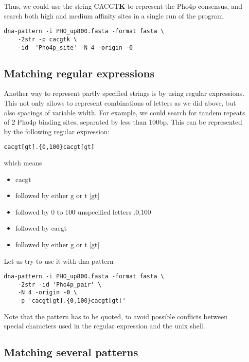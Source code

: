 Thus, we could use the string CACGT\textbf{K} to represent the Pho4p
consensus, and search both high and medium affinity sites in a single
run of the program.

\begin{verbatim}
dna-pattern -i PHO_up800.fasta -format fasta \
    -2str -p cacgtk \
    -id  'Pho4p_site' -N 4 -origin -0
\end{verbatim}

\subsection{Matching regular expressions}

Another way to represent partly specified strings is by using regular
expressions. This not only allows to represent combinations of letters
as we did above, but also spacings of variable width. For example, we
could search for tandem repeats of 2 Pho4p binding sites, separated by
less than 100bp. This can be represented by the following regular expression: 

\begin{verbatim}
cacgt[gt].{0,100}cacgt[gt]
\end{verbatim}

which means
\begin{itemize}
\item cacgt 
\item followed by either g or t [gt]
\item followed by 0 to 100 unspecified letters .{0,100}
\item followed by cacgt
\item followed by either g or t [gt]
\end{itemize}

Let us try to use it with dna-pattern

\begin{verbatim}
dna-pattern -i PHO_up800.fasta -format fasta \
    -2str -id 'Pho4p_pair' \
    -N 4 -origin -0 \
    -p 'cacgt[gt].{0,100}cacgt[gt]'
\end{verbatim}


Note that the pattern has to be quoted, to avoid possible conflicts
between special characters used in the regular expression and the unix
shell.


\subsection{Matching several patterns}

